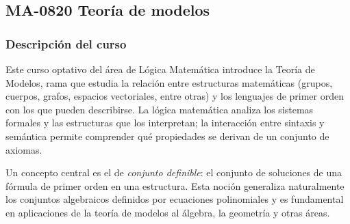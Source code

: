 \newpage
\subsection*{MA-0820 Teoría de modelos}

\hypertarget{MA0820}{}
\begin{refsection}
\begin{table}[H]
\end{table}

\subsubsection*{Descripción del curso}

Este curso optativo del área de Lógica Matemática introduce la Teoría de Modelos, rama que estudia la relación entre estructuras matemáticas (grupos, cuerpos, grafos, espacios vectoriales, entre otras) y los lenguajes de primer orden con los que pueden describirse. La lógica matemática analiza los sistemas formales y las estructuras que los interpretan; la interacción entre sintaxis y semántica permite comprender qué propiedades se derivan de un conjunto de axiomas.

Un concepto central es el de \emph{conjunto definible}: el conjunto de soluciones de una fórmula de primer orden en una estructura. Esta noción generaliza naturalmente los conjuntos algebraicos definidos por ecuaciones polinomiales y es fundamental en aplicaciones de la teoría de modelos al álgebra, la geometría y otras áreas.


\end{refsection}
